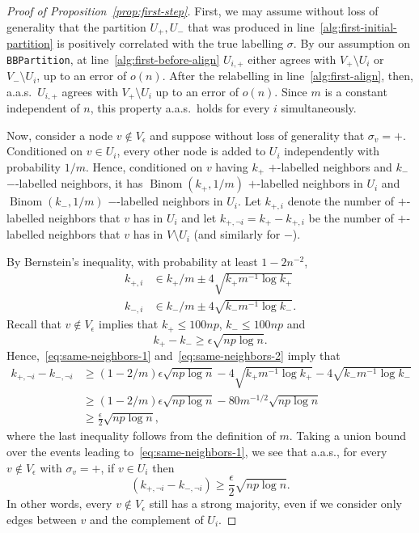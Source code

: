 \documentclass[EJP]{ejpecp}
\newcommand{\1}[1]{\mathbbm{1}_{\{#1\}}}
\DeclareMathOperator{\Binom}{Binom}
\newcommand{\noti}{\lnot i}
\begin{document}
\begin{proof}[Proof of Proposition~\ref{prop:first-step}]
 First, we may assume without loss of generality that
 the partition $U_+, U_-$ that was produced in
 line~\ref{alg:first-initial-partition} is positively correlated with the true labelling
 $\sigma$.
 By our assumption on \texttt{BBPartition}, at line~\ref{alg:first-before-align} $U_{i,+}$ either agrees with $V_+ \setminus U_i$ or $V_- \setminus U_i$,
 up to an error of $o(n)$. After the relabelling in
 line~\ref{alg:first-align}, then, a.a.s.\ $U_{i,+}$
 agrees with $V_+ \setminus U_i$ up to an error of $o(n)$.
 Since $m$ is a constant independent of $n$, this property a.a.s.\ holds
 for every $i$ simultaneously.

 Now, consider a node $v \not \in V_\epsilon$ and suppose
 without loss of generality that $\sigma_v = +$. Conditioned on $v \in U_i$,
 every other node is added to $U_i$ independently with probability $1/m$.
 Hence, conditioned on $v$ having $k_+$ $+$-labelled neighbors and $k_-$
 $-$-labelled neighbors,
 it has $\Binom(k_+, 1/m)$ $+$-labelled neighbors in $U_i$
 and $\Binom(k_-, 1/m)$ $-$-labelled neighbors in $U_i$.
 Let $k_{+,i}$ denote the number of $+$-labelled neighbors that $v$
 has in $U_i$ and let $k_{+,\noti} = k_+ - k_{+,i}$
 be the number of $+$-labelled neighbors that $v$ has in
 $V \setminus U_i$ (and similarly for $-$).

 By Bernstein's inequality, with probability at least $1-2n^{-2}$,
 \begin{align}
  \label{eq:same-neighbors-1}
  k_{+,i} &\in k_+/m \pm 4 \sqrt{k_+ m^{-1} \log k_+} \\
  \label{eq:same-neighbors-2}
  k_{-,i} &\in k_-/m \pm 4 \sqrt{k_- m^{-1} \log k_-}.
 \end{align}
 Recall that $v \not \in V_\epsilon$ implies that $k_+ \le 100np$,
 $k_- \le 100np$ and
 \[k_+ - k_- \ge \epsilon\sqrt{np\log n}.\]
 Hence,~\eqref{eq:same-neighbors-1} and~\eqref{eq:same-neighbors-2} imply that
 \begin{align*}
   k_{+,\noti} - k_{-,\noti}
   &\ge (1-2/m) \epsilon\sqrt{np \log n} - 4 \sqrt{k_+m^{-1} \log k_+} - 4 \sqrt{k_- m^{-1} \log k_-} \\
  &\ge (1-2/m) \epsilon\sqrt{np \log n} - 80 m^{-1/2} \sqrt{np \log n} \\
  &\ge \frac{\epsilon}{2} \sqrt{np \log n},
 \end{align*}
 where the last inequality follows from the definition of $m$.
 Taking a union bound over the events leading to~\eqref{eq:same-neighbors-1},
 we see that a.a.s., for every $v \not \in V_\epsilon$ with $\sigma_v = +$,
 if $v \in U_i$ then
 \begin{equation}\label{eq:first-step-large-mag}
   (k_{+,\noti} - k_{-,\noti})
  \ge \frac{\epsilon}{2} \sqrt{np \log n}.
 \end{equation}
 In other words, every $v \not \in V_\epsilon$ still has a strong majority,
 even if we consider only edges between $v$ and the complement of $U_i$.


\end{proof}
\end{document}
